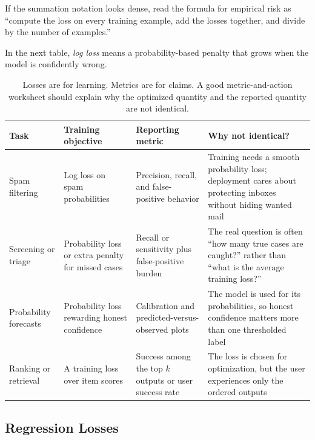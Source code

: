 \begin{prereqbridge}
If the summation notation looks dense, read the formula for empirical risk as ``compute the loss on every training example, add the losses together, and divide by the number of examples.''
\end{prereqbridge}

In the next table, \emph{log loss} means a probability-based penalty that grows when the model is confidently wrong.

\begin{table}[t]
\centering
\small
\setlength{\tabcolsep}{3pt}
\begin{tabular}{@{}>{\raggedright\arraybackslash}p{1.61cm}>{\raggedright\arraybackslash}p{2.1cm}>{\raggedright\arraybackslash}p{2.17cm}>{\raggedright\arraybackslash}p{4.27cm}@{}}
\toprule
Task & Training objective & Reporting metric & Why not identical? \\
\midrule
Spam filtering & Log loss on spam probabilities & Precision, recall, and false-positive behavior & Training needs a smooth probability loss; deployment cares about protecting inboxes without hiding wanted mail \\
Screening or triage & Probability loss or extra penalty for missed cases & Recall or sensitivity plus false-positive burden & The real question is often ``how many true cases are caught?'' rather than ``what is the average training loss?'' \\
Probabil\-ity forecasts & Probability loss rewarding honest confidence & Calibration and predicted-versus-observed plots & The model is used for its probabilities, so honest confidence matters more than one thresholded label \\
Ranking or retrieval & A training loss over item scores & Success among the top $k$ outputs or user success rate & The loss is chosen for optimization, but the user experiences only the ordered outputs \\
\bottomrule
\end{tabular}
\caption{Losses are for learning. Metrics are for claims. A good metric-and-action worksheet should explain why the optimized quantity and the reported quantity are not identical.}
\label{tab:loss-vs-metric}
\end{table}

\subsection{Regression Losses}

